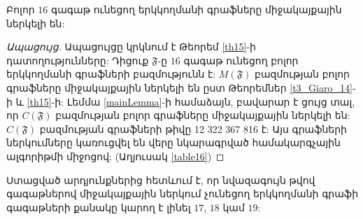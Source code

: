 \begin{theorem}
\label{th16}
Բոլոր $16$ գագաթ ունեցող երկկողմանի գրաֆները միջակայքային ներկելի են:
\end{theorem}
\begin{proof}[Ապացույց]
Ապացույցը կրկնում է Թեորեմ \ref{th15}-ի դատողությունները: Դիցուք $\mathfrak{F}$-ը $16$ գագաթ ունեցող բոլոր երկկողմանի գրաֆների բազմությունն է: $M(\mathfrak{F})$ բազմության բոլոր գրաֆները միջակայքային ներկելի են ըստ Թեորեմներ \ref{t3_Giaro_14}-ի և \ref{th15}-ի: Լեմմա \ref{mainLemma}-ի համաձայն, բավարար է ցույց տալ, որ $C(\mathfrak{F})$ բազմության բոլոր գրաֆները միջակայքային ներկելի են: $C(\mathfrak{F})$ բազմության գրաֆների թիվը 12 322 367 816 է: Այս գրաֆների ներկումները կառուցվել են վերը նկարագրված համակարգչային ալգորիթմի միջոցով: (Աղյուսակ \ref{table16})
\end{proof}

Ստացված արդյունքներից հետևում է, որ նվազագույն թվով գագաթներով միջակայքային ներկում չունեցող երկկողմանի գրաֆի գագաթների քանակը կարող է լինել $17$, $18$ կամ $19$: